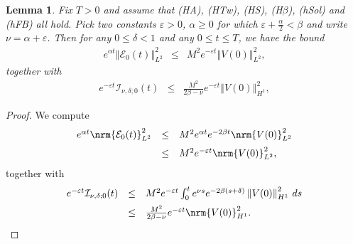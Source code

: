 \documentclass[10pt]{articleHJ}
\renewcommand{\b}{\ensuremath{\beta}}
\newcommand{\e}{\ensuremath{\varepsilon}}
\renewcommand{\a}{\ensuremath{\alpha}}
\DeclarePairedDelimiter{\nrm}\lVert\rVert
\newcommand{\norm}[1]{\left\Vert#1\right\Vert}		%
\newtheorem{lem}[thm]{Lemma}
\numberwithin{equation}{section}
\begin{document}
\begin{lem}
\label{lem:nls:e:zero}
Fix $T > 0$ and assume that (HA), (HTw), (HS), (H$\beta$),
(hSol) and (hFB) all hold.
Pick two constants $\e > 0$, $\alpha \ge 0$
for which $ \e + \frac{\alpha}{2} < \beta$
and write $\nu = \alpha + \e$.
Then for any
$0 \le \delta < 1$
and any $0 \le t \le T$,
we have the bound
\begin{equation}
\begin{array}{lcl}
e^{\alpha t} \norm{\mathcal{E}_0(t)}_{L^2}^2
 & \le &  M^2e^{-\e t} \norm{V(0)}^2_{L^2},
\end{array}
\end{equation}
together with
\begin{equation}
\begin{array}{lcl}
 e^{-\e t} \mathcal{I}_{\nu,\delta;0}(t)
 & \le &  \frac{M^2}{2 \beta - \nu}e^{-\e t} \norm{V(0)}^2_{H^1},
\end{array}
\end{equation}
\end{lem}
\begin{proof}
We compute
\begin{equation}
\begin{array}{lcl}
e^{\a t }\nrm{\mathcal{E}_{0}(t)}_{L^2}^2
  &\leq  & M^2 e^{ \alpha t} e^{-2 \beta t}
  \nrm{V(0)}_{L^2}^2  \\[0.2cm]
&\leq & M^2e^{-\e t}\nrm{V(0)}_{L^2}^2,
\end{array}
\end{equation}
together with
\begin{equation}
\begin{array}{lcl}
 e^{-\e t} \mathcal{I}_{\nu,\delta;0}(t)
& \le &
M^2 e^{-\e  t} \int_0^{t}e^{\nu s} e^{-2 \beta( s + \delta ) } \norm{V(0)}_{H^1}^2 \, ds
\\[0.2cm]
& \le &
   \frac{M^2}{2\b-\nu}e^{-\e t}\nrm{V(0)}^2_{H^1} .
\end{array}
\end{equation}
\end{proof}
\end{document}
